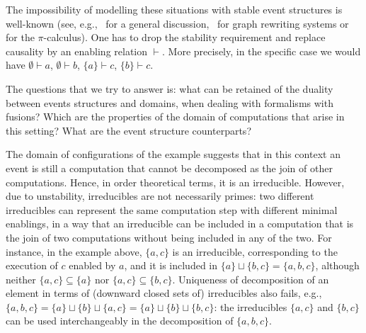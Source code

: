 The impossibility of modelling these situations with stable
event structures 
is well-known (see,
e.g.,~\cite{Win:ES} for a general discussion,~\cite{Handbook} for
graph rewriting systems or~\cite{CVY:ESSPE} for the $\pi$-calculus). One has
to drop the stability requirement and replace causality
by an enabling relation $\vdash$. More precisely, in the specific case 
we would have
$\emptyset \vdash a$, $\emptyset \vdash b$, $\{ a \} \vdash c$,
$\{ b \} \vdash c$.


\medskip

The questions that we try to answer is: what can be retained of the
duality between events structures and domains, when 
dealing with formalisms with fusions? Which are the properties of 
the domain of computations that arise in this setting? What are the 
event structure counterparts?

The domain of configurations of the example suggests that in this
context an event is still a computation that cannot be decomposed
as the join of other computations. Hence, in order theoretical terms,
it is an irreducible.
%
However, %
%
due to unstability, irreducibles are not {necessarily} primes: two different
irreducibles can {represent the same computation step with different minimal enablings}, 
in
a way that an irreducible can be included in a computation that is the
join of two computations without being included in any of the two. For
instance, in the example above, $\{ a, c \}$ is an irreducible,
corresponding to the execution of $c$ enabled by $a$, and it is
included in $\{ a \} \sqcup \{ b, c \} = \{ a, b , c \}$,
although neither
$\{ a, c \} \subseteq \{ a \}$ nor
$\{ a, c \} \subseteq \{ b , c \}$.
%
Uniqueness of decomposition of an element in terms of (downward closed sets of) irreducibles
also fails, e.g.,
$\{a,b,c\} = \{a\} \sqcup \{b\} \sqcup \{a,c\} = \{a\} \sqcup \{b\} \sqcup
\{b,c\}$: the irreducibles $\{a,c\}$ and $\{b,c\}$ can be used
interchangeably in the decomposition of $\{a,b,c\}$.

